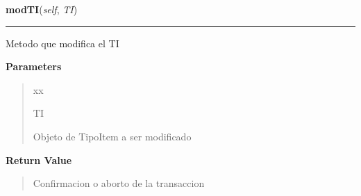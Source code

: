 \hspace{.8\funcindent}\begin{boxedminipage}{\funcwidth}

    \raggedright \textbf{modTI}(\textit{self}, \textit{TI})

    \vspace{-1.5ex}

    \rule{\textwidth}{0.5\fboxrule}
\setlength{\parskip}{2ex}
    Metodo que modifica el TI

\setlength{\parskip}{1ex}
      \textbf{Parameters}
      \vspace{-1ex}

      \begin{quote}
        \begin{Ventry}{xx}

          \item[TI]

          Objeto de TipoItem a ser modificado

        \end{Ventry}

      \end{quote}

      \textbf{Return Value}
    \vspace{-1ex}

      \begin{quote}
      Confirmacion o aborto de la transaccion

      \end{quote}

    \end{boxedminipage}

